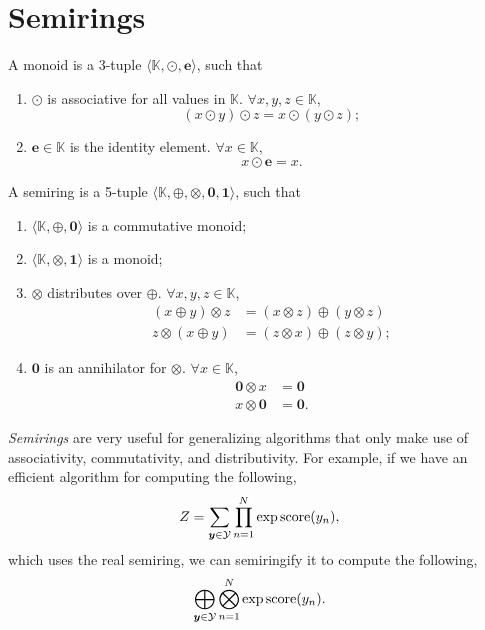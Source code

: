 \section{Semirings} \label{sec:semirings}

\begin{definition}[Monoid]
  A monoid is a 3-tuple $\langle \mathbb{K},\odot,\bm{e} \rangle$, such that
  \begin{enumerate}
    \item $\odot$ is associative for all values in $\mathbb{K}$. $\forall x,y,z
      \in \mathbb{K}$, \[
        (x\odot y)\odot z = x\odot (y\odot z)
      ;\]
  \item $\bm{e}\in \mathbb{K}$ is the identity element. $\forall x \in
    \mathbb{K}$, \[
        x \odot \bm{e} = x
      .\] 
  \end{enumerate}
\end{definition}

\begin{definition}[Semiring]
  A semiring is a 5-tuple $\langle \mathbb{K},\oplus,\otimes,\bm{0},\bm{1}
  \rangle$, such that
  \begin{enumerate}
    \item $\langle \mathbb{K},\oplus,\bm{0} \rangle$ is a commutative monoid;
    \item $\langle \mathbb{K},\otimes,\bm{1} \rangle$ is a monoid;
    \item $\otimes$ distributes over $\oplus$. $\forall x,y,z\in \mathbb{K}$,
      \begin{align*}
        (x\oplus y) \otimes z &= (x\otimes z) \oplus (y \otimes z) \\
        z\otimes (x \oplus y) &= (z\otimes x) \oplus (z\otimes y)
      ;\end{align*}
    \item $\bm{0}$ is an annihilator for $\otimes$. $\forall x \in \mathbb{K}$,
      \begin{align*}
        \bm{0} \otimes x &= \bm{0} \\
        x \otimes \bm{0} &= \bm{0}
      .\end{align*}
  \end{enumerate}
\end{definition}

\textit{Semirings} are very useful for generalizing algorithms that only make use of
associativity, commutativity, and distributivity. For example, if we have an
efficient algorithm for computing the following, \[
  Z = \sum_{\bm{y}\in\mathcal{Y}} \prod_{n=1}^N \exp \mathrm{score}(y_n)
,\]
which uses the real semiring, we can semiringify it to compute the following,
\[
  \bigoplus_{\bm{y}\in\mathcal{Y}} \bigotimes_{n=1}^N \exp \mathrm{score}(y_n)
.\]

